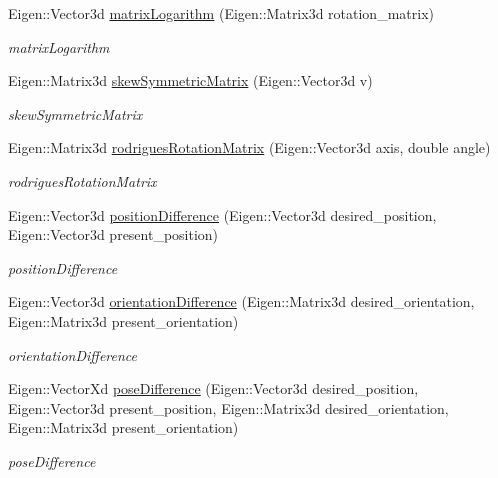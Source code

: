 \begin{DoxyCompactItemize}
Eigen\+::\+Vector3d \hyperlink{namespacerobotis__manipulator_1_1math_a38b3c7716c5b8a29a75d8b3243eb75e7}{matrix\+Logarithm} (Eigen\+::\+Matrix3d rotation\+\_\+matrix)
\begin{DoxyCompactList}\small\item\em matrix\+Logarithm \end{DoxyCompactList}\item 
Eigen\+::\+Matrix3d \hyperlink{namespacerobotis__manipulator_1_1math_a03bf0fffc828339f2216fd4a98a32923}{skew\+Symmetric\+Matrix} (Eigen\+::\+Vector3d v)
\begin{DoxyCompactList}\small\item\em skew\+Symmetric\+Matrix \end{DoxyCompactList}\item 
Eigen\+::\+Matrix3d \hyperlink{namespacerobotis__manipulator_1_1math_a515d31a7d3b19cce814cd121717bcb60}{rodrigues\+Rotation\+Matrix} (Eigen\+::\+Vector3d axis, double angle)
\begin{DoxyCompactList}\small\item\em rodrigues\+Rotation\+Matrix \end{DoxyCompactList}\item 
Eigen\+::\+Vector3d \hyperlink{namespacerobotis__manipulator_1_1math_ab4f15d22dddddc5f712de188ba0f85f4}{position\+Difference} (Eigen\+::\+Vector3d desired\+\_\+position, Eigen\+::\+Vector3d present\+\_\+position)
\begin{DoxyCompactList}\small\item\em position\+Difference \end{DoxyCompactList}\item 
Eigen\+::\+Vector3d \hyperlink{namespacerobotis__manipulator_1_1math_a26796dad948a40bc2c0ac2c139ed85f0}{orientation\+Difference} (Eigen\+::\+Matrix3d desired\+\_\+orientation, Eigen\+::\+Matrix3d present\+\_\+orientation)
\begin{DoxyCompactList}\small\item\em orientation\+Difference \end{DoxyCompactList}\item 
Eigen\+::\+Vector\+Xd \hyperlink{namespacerobotis__manipulator_1_1math_a5bf9202c405abf15e234505842bf7361}{pose\+Difference} (Eigen\+::\+Vector3d desired\+\_\+position, Eigen\+::\+Vector3d present\+\_\+position, Eigen\+::\+Matrix3d desired\+\_\+orientation, Eigen\+::\+Matrix3d present\+\_\+orientation)
\begin{DoxyCompactList}\small\item\em pose\+Difference \end{DoxyCompactList}\end{DoxyCompactItemize}


